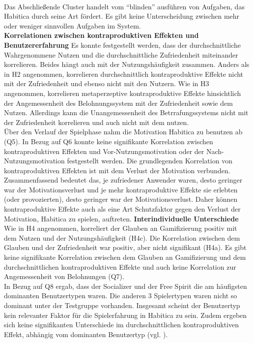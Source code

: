 \documentclass[sigconf, nonacm]{acmart}
\begin{document}
\\
Das Abschließende Cluster handelt vom \enquote{blinden} ausführen von Aufgaben, das Habitica durch seine Art fördert. Es gibt keine Unterscheidung zwischen mehr oder weniger sinnvollen Aufgaben im System. 
\\
\textbf{Korrelationen zwischen kontraproduktiven Effekten und Benutzererfahrung}
Es konnte festgestellt werden, dass der durchschnittliche Wahrgenommene Nutzen und die durchschnittliche Zufriedenheit miteinander korrelieren. Beides hängt auch mit der Nutzungshäufigkeit zusammen. 
Anders als in H2 angenommen, korrelieren durchschnittlich kontraproduktive Effekte nicht mit der Zufriedenheit und ebenso nicht mit den Nutzern. Wie in H3 angenommen, korrelieren metaperzeptive kontraproduktive Effekte hinsichtlich der Angemessenheit des Belohnungssystem mit der Zufriedenheit sowie dem Nutzen. Allerdings kann die Unangemessenheit des Betrrafungssystems nicht mit der Zufriedenheit korrelieren und auch nicht mit dem nutzen.
\\
Über den Verlauf der Spielphase nahm die Motivation Habitica zu benutzen ab (Q5). In Bezug auf Q6 konnte keine signifikante Korrelation zwischen kontraproduktiven Effekten und Vor-Nutzungsmotivation oder der Nach-Nutzungsmotivation festgestellt werden. Die grundlegenden Korrelation von kontraproduktiven Effekten ist mit dem Verlust der Motivation verbunden. Zusammenfassend bedeutet das, je zufriedener Anwender waren, desto geringer war der Motivationsverlust und je mehr kontraproduktive Effekte sie erlebten (oder provozierten), desto geringer war der Motivationsverlust. Daher können kontraproduktive Effekte auch als eine Art Schutzfaktor gegen den Verlust der Motivation, Habitica zu spielen, auftreten. 
\textbf{Interindividuelle Unterschiede}
Wie in H4 angenommen, korreliert der Glauben an Gamifizierung positiv mit dem Nutzen und der Nutzungshäufigkeit (H4c). Die Korrelation zwischen dem Glauben und der Zufriedenheit war positiv, aber nicht signifikant (H4a). Es gibt keine signifikante Korrelation zwischen dem Glauben an Gamifizierung und dem durchschnittlichen kontraproduktiven Effekte und auch keine Korrelation zur Angemessenheit von Belohnungen (Q7).
\\
In Bezug auf Q8 ergab, dass der Socializer und der Free Spirit die am häufigsten dominanten Benutzertypen waren. Die anderen 3 Spielertypen waren nicht so dominant unter der Testgruppe vorhanden. Insgesamt scheint der Benutzertyp kein relevanter Faktor für die Spielerfahrung in Habitica zu sein. Zudem ergeben sich keine signifikanten Unterschiede im durchschnittlichen kontraproduktiven Effekt, abhängig vom dominanten Benutzertyp (vgl. \citep{diefenbach_counterproductive_2019}).
\end{document}
